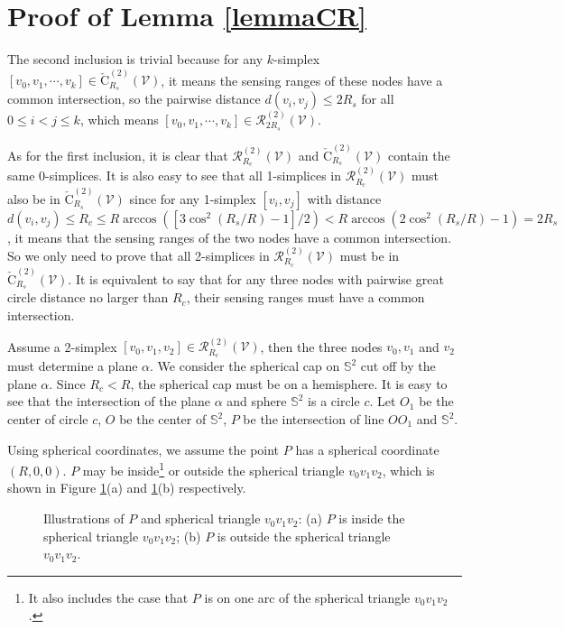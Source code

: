 \documentclass[journal, twoside]{IEEEtran}
\begin{document}
\appendices
\section{Proof of Lemma \ref{lemmaCR}} \label{app1}

\begin{IEEEproof}
The second inclusion is trivial because for any $k$-simplex 
$[v_0,v_1,\cdots, v_k]\in \check{\textrm{C}}_{R_s}^{(2)}(\mathcal{V})$, 
it means the sensing ranges of these nodes have a common intersection,
so the pairwise distance $d(v_i,v_j) \leq 2R_s$ for all $0\leq i < j \leq k$,
which means  $[v_0,v_1,\cdots, v_k]\in \mathcal{R}_{2R_s}^{(2)}(\mathcal{V})$.

As for the first inclusion, it is clear that $\mathcal{R}_{R_c}^{(2)}(\mathcal{V})$
and $\check{\textrm{C}}_{R_s}^{(2)}(\mathcal{V})$ contain the same 0-simplices.
It is also easy to see that all 1-simplices
in $\mathcal{R}_{R_c}^{(2)}(\mathcal{V})$ must also be in 
$\check{\textrm{C}}_{R_s}^{(2)}(\mathcal{V})$ since for any 1-simplex $[v_i,v_j]$
with distance $d(v_i,v_j)\leq R_c \leq R \arccos ([3\cos^2(R_s/R)-1]/2) <
R \arccos(2\cos^2(R_s/R)-1) = 2R_s$, it means that the sensing ranges of the two nodes
have a common intersection. So we only need to prove that all 2-simplices in 
$\mathcal{R}_{R_c}^{(2)}(\mathcal{V})$ must be in $\check{\textrm{C}}_{R_s}^{(2)}(\mathcal{V})$.
It is equivalent to say that for any three nodes with pairwise great circle distance no larger than
$R_c$, their sensing ranges must have a common intersection. 

Assume a 2-simplex $[v_0,v_1,v_2] \in \mathcal{R}_{R_c}^{(2)}(\mathcal{V})$,
then the three nodes $v_0, v_1$ and $v_2$ must determine a plane $\alpha$. We consider
the spherical cap on $\mathbb{S}^2$ cut off by the plane $\alpha$. Since 
$R_c < R$, the spherical cap must be on a hemisphere. It is easy
to see that the intersection of the plane $\alpha$ and sphere $\mathbb{S}^2$
is a circle $c$. Let $O_1$ be the center of circle $c$, $O$ be the center of $\mathbb{S}^2$,
$P$ be the intersection of line $OO_1$ and $\mathbb{S}^2$.

Using spherical coordinates, we assume the point $P$ has a spherical coordinate $(R, 0, 0)$.
$P$ may be inside\footnote{It also includes the case that $P$ is on one arc of the spherical
triangle $v_0v_1v_2$.} or outside the spherical triangle $v_0v_1v_2$, which is shown in
Figure \ref{sphericaltri}(a) and \ref{sphericaltri}(b) respectively. 

\begin{figure}[ht]
  \centering {}  
  \caption{Illustrations of $P$ and spherical triangle $v_0v_1v_2$: (a) $P$ is 
  inside the spherical triangle $v_0v_1v_2$; (b) $P$ is outside the spherical triangle $v_0v_1v_2$. }
  \label{sphericaltri}
\end{figure}


\end{IEEEproof}
\end{document}
